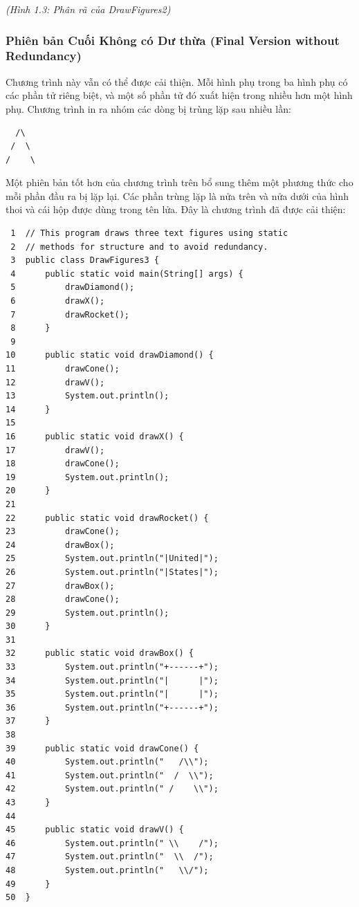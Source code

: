 \emph{(Hình 1.3: Phân rã của DrawFigures2)}

\subsubsection{Phiên bản Cuối Không có Dư thừa (Final Version without
Redundancy)}\label{phiuxean-bux1ea3n-cuux1ed1i-khuxf4ng-cuxf3-dux1b0-thux1eeba-final-version-without-redundancy}

Chương trình này vẫn có thể được cải thiện. Mỗi hình phụ trong ba hình
phụ có các phần tử riêng biệt, và một số phần tử đó xuất hiện trong
nhiều hơn một hình phụ. Chương trình in ra nhóm các dòng bị trùng lặp
sau nhiều lần:

\begin{verbatim}
  /\ 
 /  \ 
/    \
\end{verbatim}

Một phiên bản tốt hơn của chương trình trên bổ sung thêm một phương thức
cho mỗi phần đầu ra bị lặp lại. Các phần trùng lặp là nửa trên và nửa
dưới của hình thoi và cái hộp được dùng trong tên lửa. Đây là chương
trình đã được cải thiện:

\begin{verbatim}
 1  // This program draws three text figures using static
 2  // methods for structure and to avoid redundancy.
 3  public class DrawFigures3 {
 4      public static void main(String[] args) {
 5          drawDiamond();
 6          drawX();
 7          drawRocket();
 8      }
 9
10      public static void drawDiamond() {
11          drawCone();
12          drawV();
13          System.out.println();
14      }
15
16      public static void drawX() {
17          drawV();
18          drawCone();
19          System.out.println();
20      }
21
22      public static void drawRocket() {
23          drawCone();
24          drawBox();
25          System.out.println("|United|");
26          System.out.println("|States|");
27          drawBox();
28          drawCone();
29          System.out.println();
30      }
31
32      public static void drawBox() {
33          System.out.println("+------+");
34          System.out.println("|      |");
35          System.out.println("|      |");
36          System.out.println("+------+");
37      }
38
39      public static void drawCone() {
40          System.out.println("   /\\");
41          System.out.println("  /  \\");
42          System.out.println(" /    \\");
43      }
44
45      public static void drawV() {
46          System.out.println(" \\    /");
47          System.out.println("  \\  /");
48          System.out.println("   \\/");
49      }
50  }
\end{verbatim}

